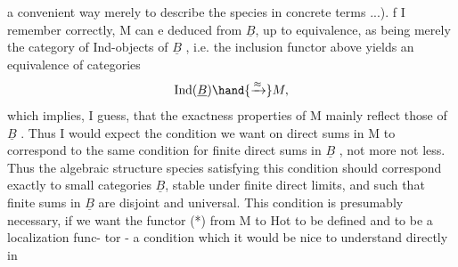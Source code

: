a convenient way merely to describe the species in concrete terms ...).
f I remember correctly,  M can e deduced from $\underline{B}$,  up to equivalence,
as being merely the category of Ind-objects of $\underline{B}$ ,  i.e. the inclusion
functor above yields an equivalence of categories
\[ \mathrm{Ind}(\underline{B}) \hand{\xrightarrow{\approx}} M , \]
which implies, I guess,  that the exactness properties of M mainly
reflect those of $\underline{B}$ .  Thus I would expect the condition we want on direct
sums in M to correspond to the same condition for finite direct sums in
$\underline{B}$ ,  not more not less.  Thus the algebraic structure species satisfying
this condition should correspond exactly to small categories $\underline{B}$,  stable
under finite direct limits,  and such that finite sums in $\underline{B}$ are disjoint
and universal.   This condition is presumably necessary,  if we want the
functor (*) from M to Hot  to be defined and to be a localization func-%
tor  -   a condition which it would be nice to understand directly in 
